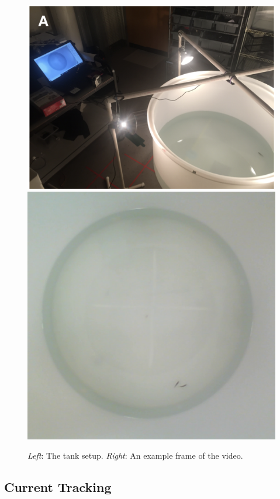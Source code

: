 \documentclass{article}
\newlength{\mylen}
\begin{document}
\begin{figure}[H]
	\centering
	\setlength{\mylen}{0.35\linewidth}
	\includegraphics[height=\mylen]{experimental_design}
	\hspace{0.01\linewidth}
	\includegraphics[height=\mylen]{figures.frame5140}
	\caption{\emph{Left}: The tank setup. \emph{Right}: An example frame of the video.}
\end{figure}

\subsection{Current Tracking}
\end{document}
